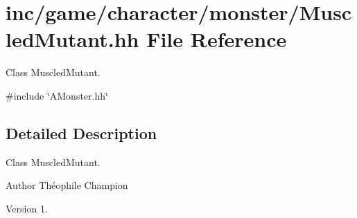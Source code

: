 \hypertarget{MuscledMutant_8hh}{}\section{inc/game/character/monster/\+Muscled\+Mutant.hh File Reference}
\label{MuscledMutant_8hh}


Class Muscled\+Mutant.  


{\ttfamily \#include \char`\"{}A\+Monster.\+hh\char`\"{}}\newline


\subsection{Detailed Description}
Class Muscled\+Mutant. 

\begin{DoxyAuthor}{Author}
Théophile Champion 
\end{DoxyAuthor}
\begin{DoxyVersion}{Version}
1. 
\end{DoxyVersion}

